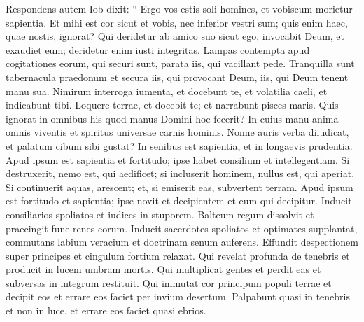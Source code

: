 \begin{biblechapter}
\begin{biblechapter}
\begin{biblechapter}
\begin{biblechapter}
\begin{biblechapter}
\begin{biblechapter}
\begin{biblechapter}
\begin{biblechapter}
\begin{biblechapter}
\begin{biblechapter}
\begin{biblechapter}
\begin{biblechapter}
\verse Respondens autem Iob dixit:
 \verse “ Ergo vos estis soli homines,
 et vobiscum morietur sapientia.
 \verse Et mihi est cor sicut et vobis,
 nec inferior vestri sum;
 quis enim haec, quae nostis, ignorat?
 \verse Qui deridetur ab amico suo sicut ego,
 invocabit Deum, et exaudiet eum; deridetur enim iusti integritas.
 \verse Lampas contempta apud cogitationes eorum, qui securi sunt,
 parata iis, qui vacillant pede.
 \verse Tranquilla sunt tabernacula praedonum
 et secura iis, qui provocant Deum, iis, qui Deum tenent manu sua.
 \verse Nimirum interroga iumenta, et docebunt te,
 et volatilia caeli, et indicabunt tibi. 
\verse Loquere terrae, et docebit te;
 et narrabunt pisces maris.
 \verse Quis ignorat in omnibus his
 quod manus Domini hoc fecerit?
 \verse In cuius manu anima omnis viventis
 et spiritus universae carnis hominis. 
\verse Nonne auris verba diiudicat,
 et palatum cibum sibi gustat?
 \verse In senibus est sapientia,
 et in longaevis prudentia.
 \verse Apud ipsum est sapientia et fortitudo;
 ipse habet consilium et intellegentiam.
 \verse Si destruxerit, nemo est, qui aedificet;
 si incluserit hominem, nullus est, qui aperiat.
 \verse Si continuerit aquas, arescent;
 et, si emiserit eas, subvertent terram.
 \verse Apud ipsum est fortitudo et sapientia;
 ipse novit et decipientem et eum qui decipitur.
 \verse Inducit consiliarios spoliatos
 et iudices in stuporem.
 \verse Balteum regum dissolvit
 et praecingit fune renes eorum.
 \verse Inducit sacerdotes spoliatos
 et optimates supplantat,
 \verse commutans labium veracium
 et doctrinam senum auferens.
 \verse Effundit despectionem super principes
 et cingulum fortium relaxat.
 \verse Qui revelat profunda de tenebris
 et producit in lucem umbram mortis.
 \verse Qui multiplicat gentes et perdit eas
 et subversas in integrum restituit.
 \verse Qui immutat cor principum populi terrae et decipit eos
 et errare eos faciet per invium desertum.
 \verse Palpabunt quasi in tenebris et non in luce,
 et errare eos faciet quasi ebrios.
 

\end{biblechapter}
\end{biblechapter}
\end{biblechapter}
\end{biblechapter}
\end{biblechapter}
\end{biblechapter}
\end{biblechapter}
\end{biblechapter}
\end{biblechapter}
\end{biblechapter}
\end{biblechapter}
\end{biblechapter}
